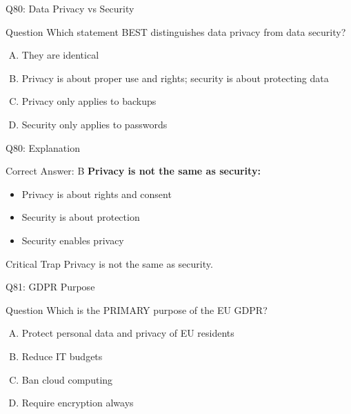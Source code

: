 \documentclass{beamer}
\begin{document}
	\begin{frame}{Q80: Data Privacy vs Security}
		\begin{block}{Question}
			Which statement BEST distinguishes data privacy from data security?
		\end{block}
		\begin{enumerate}[(A)]
			\item They are identical
			\item Privacy is about proper use and rights; security is about protecting data
			\item Privacy only applies to backups
			\item Security only applies to passwords
		\end{enumerate}
	\end{frame}
	
	\begin{frame}{Q80: Explanation}
		\begin{block}{Correct Answer: B}
			\textbf{Privacy is not the same as security:}
			\begin{itemize}
				\item Privacy is about rights and consent
				\item Security is about protection
				\item Security enables privacy
			\end{itemize}
		\end{block}
		\begin{alertblock}{Critical Trap}
			Privacy is not the same as security.
		\end{alertblock}
	\end{frame}
	
	\begin{frame}{Q81: GDPR Purpose}
		\begin{block}{Question}
			Which is the PRIMARY purpose of the EU GDPR?
		\end{block}
		\begin{enumerate}[(A)]
			\item Protect personal data and privacy of EU residents
			\item Reduce IT budgets
			\item Ban cloud computing
			\item Require encryption always
		\end{enumerate}
	\end{frame}
	
\end{document}
